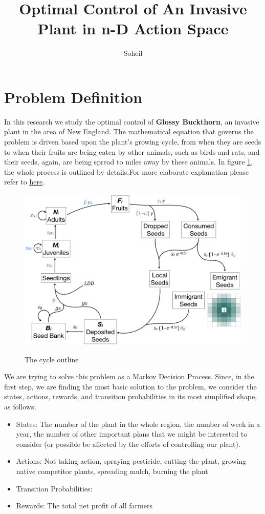 \documentclass{article}
\title{ Optimal Control of An Invasive Plant in n-D Action Space}
\author{Soheil}
\date{}
\theoremstyle{remark}
\theoremstyle{remark}
\theoremstyle{remark}
\theoremstyle{remark}
\theoremstyle{remark}
\theoremstyle{remark}
\begin{document}
\maketitle
\section{Problem Definition}
In this research we study the optimal control of \textbf{Glossy Buckthorn}, an invasive plant in the area of New England. The mathematical equation that governs the problem is driven based upon the plant's growing cycle, from when they are seeds to when their fruits are being eaten by other animals, such as birds and rats, and their seeds, again, are being spread to miles away by these animals. In figure \ref{fig:outline}, the whole process is outlined by details.For more elaborate explanation please refer to \href{https://github.com/rlsquared/gbPopMod}{here}.

\begin{figure}
\centering
\includegraphics[scale=.2]{model_outline.jpeg}
\label{fig:outline}
\caption{The cycle outline}
\end{figure}

We are trying to solve this problem as a Markov Decision Process. Since, in the first step, we are finding the most basic solution to the problem, we consider the states, actions, rewards, and transition probabilities in its most simplified shape, as follows;

\begin{itemize}
 \item States: The number of the plant in the whole region, the number of week in a year, the number of other important plans that we might be interested to consider (or possible be affected by the efforts of controlling our plant).
 \item Actions: Not taking action, spraying pesticide, cutting the plant, growing native competitor plants, spreading mulch, burning the plant
 \item Transition Probabilities:
 \item Rewards: The total net profit of all farmers
\end{itemize}
\end{document}
